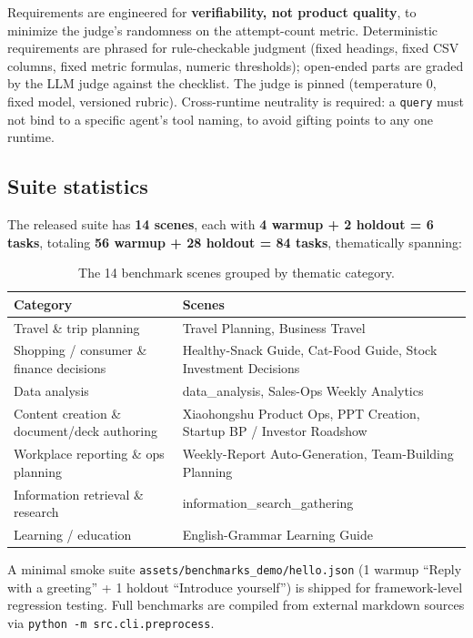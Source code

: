 \documentclass{article}
\begin{document}
Requirements are engineered for \textbf{verifiability, not product quality}, to minimize the judge's randomness on the attempt-count metric. Deterministic requirements are phrased for rule-checkable judgment (fixed headings, fixed CSV columns, fixed metric formulas, numeric thresholds); open-ended parts are graded by the LLM judge against the checklist. The judge is pinned (temperature 0, fixed model, versioned rubric). Cross-runtime neutrality is required: a \texttt{query} must not bind to a specific agent's tool naming, to avoid gifting points to any one runtime.

\subsection{Suite statistics}

The released suite has \textbf{14 scenes}, each with \textbf{4 warmup + 2 holdout = 6 tasks}, totaling \textbf{56 warmup + 28 holdout = 84 tasks}, thematically spanning:

\begin{table}[h]
\centering
\caption{The 14 benchmark scenes grouped by thematic category.}
\label{tab:scenes}
\begin{tabular}{P{0.4\textwidth}P{0.55\textwidth}}
\toprule
Category & Scenes \\
\midrule
Travel \& trip planning & Travel Planning, Business Travel \\
Shopping / consumer \& finance decisions & Healthy-Snack Guide, Cat-Food Guide, Stock Investment Decisions \\
Data analysis & data\_analysis, Sales-Ops Weekly Analytics \\
Content creation \& document/deck authoring & Xiaohongshu Product Ops, PPT Creation, Startup BP / Investor Roadshow \\
Workplace reporting \& ops planning & Weekly-Report Auto-Generation, Team-Building Planning \\
Information retrieval \& research & information\_search\_gathering \\
Learning / education & English-Grammar Learning Guide \\
\bottomrule
\end{tabular}
\end{table}

A minimal smoke suite \texttt{assets/benchmarks\_demo/hello.json} (1 warmup ``Reply with a greeting'' + 1 holdout ``Introduce yourself'') is shipped for framework-level regression testing. Full benchmarks are compiled from external markdown sources via \texttt{python -m src.cli.preprocess}.
\end{document}
